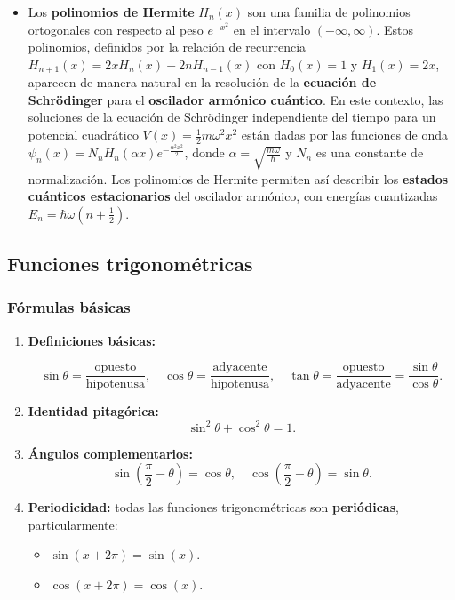 \documentclass[12pt, a4paper]{article}
\theoremstyle{rioplatense}
\begin{document}
\begin{itemize}
    \item Los \textbf{polinomios de Hermite} \(H_n(x)\) son una familia de polinomios ortogonales con respecto al peso \(e^{-x^2}\) en el intervalo \((-\infty, \infty)\). Estos polinomios, definidos por la relación de recurrencia \(H_{n+1}(x) = 2xH_n(x) - 2nH_{n-1}(x)\) con \(H_0(x) = 1\) y \(H_1(x) = 2x\), aparecen de manera natural en la resolución de la \textbf{ecuación de Schrödinger} para el \textbf{oscilador armónico cuántico}. En este contexto, las soluciones de la ecuación de Schrödinger independiente del tiempo para un potencial cuadrático \(V(x) = \frac{1}{2}m\omega^2x^2\) están dadas por las funciones de onda \(\psi_n(x) = N_n H_n(\alpha x)e^{-\frac{\alpha^2x^2}{2}}\), donde \(\alpha = \sqrt{\frac{m\omega}{\hbar}}\) y \(N_n\) es una constante de normalización. Los polinomios de Hermite permiten así describir los \textbf{estados cuánticos estacionarios} del oscilador armónico, con energías cuantizadas \(E_n = \hbar\omega(n + \frac{1}{2})\).

\end{itemize}

\subsection{Funciones trigonométricas}

\subsubsection{Fórmulas básicas}

\begin{enumerate}
\item \textbf{Definiciones básicas:}  

\[
\sin \theta = \frac{\text{opuesto}}{\text{hipotenusa}}, \quad  
\cos \theta = \frac{\text{adyacente}}{\text{hipotenusa}}, \quad  
\tan \theta = \frac{\text{opuesto}}{\text{adyacente}} = \frac{\sin \theta}{\cos \theta} .
\]

\item \textbf{Identidad pitagórica:}
\[
\sin^2 \theta + \cos^2 \theta = 1.
\]



\item \textbf{Ángulos complementarios:}
\[
\sin\left(\frac{\pi}{2} - \theta\right) = \cos \theta, \quad
\cos\left(\frac{\pi}{2} - \theta\right) = \sin \theta.
\]
\item \textbf{Periodicidad:}
todas las funciones trigonométricas son \textbf{periódicas}, particularmente:
\begin{itemize}
    \item \( \sin(x + 2\pi) = \sin(x) \).
    \item \( \cos(x + 2\pi) = \cos(x) \).
\end{itemize}


\end{enumerate}
\end{document}
